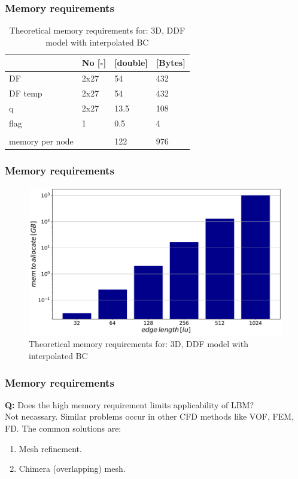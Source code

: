 \documentclass[10pt]{beamer}
\begin{document}
\begin{frame}\frametitle{Memory requirements}

\begin{table}[]
\centering
\begin{tabular}{l|lll}
                & No {[}-{]} & {[}double{]} & {[}Bytes{]} \\ \hline
DF              & 2x27       & 54           & 432         \\
DF temp         & 2x27       & 54           & 432         \\
q               & 2x27       & 13.5         & 108         \\
flag            & 1          & 0.5          & 4           \\
                &            &              &             \\
memory per node &            & 122          & 976        
\end{tabular}%
\caption{Theoretical memory requirements for: \newline 3D, DDF model with interpolated BC}
\end{table}

\end{frame}


\begin{frame}\frametitle{Memory requirements}
\begin{figure}
\includegraphics[width = 1 \textwidth]{obrazki/log_mem_req.pdf} 
\caption{Theoretical memory requirements for: \newline 3D, DDF model with interpolated BC}
\end{figure}
\end{frame}


\begin{frame}\frametitle{Memory requirements}
\textbf{Q:} Does the high memory requirement limits applicability of LBM? \\ \vspace{1.5em}
\pause
Not necassary. Similar problems occur in other CFD methods like VOF, FEM, FD.
The common solutions are:
\begin{enumerate}
\item Mesh refinement. 
\item Chimera (overlapping) mesh. 
\end{enumerate}
\end{frame}
\end{document}
